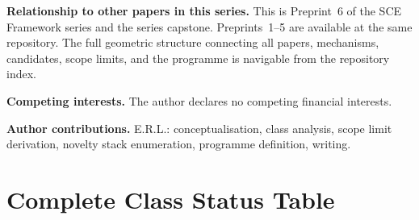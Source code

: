 \documentclass[11pt]{article}
\theoremstyle{plain}
\theoremstyle{definition}
\theoremstyle{remark}
\begin{document}
\noindent\textbf{Relationship to other papers in this series.}
This is Preprint~6 of the SCE Framework series and the series
capstone.  Preprints~1--5 are available at the same repository.
The full geometric structure connecting all papers, mechanisms,
candidates, scope limits, and the programme is navigable from
the repository index.

\noindent\textbf{Competing interests.}
The author declares no competing financial interests.

\noindent\textbf{Author contributions.}
E.R.L.: conceptualisation, class analysis, scope limit
derivation, novelty stack enumeration, programme definition,
writing.

\appendix

\section{Complete Class Status Table}
\label{app:class_table}
\end{document}
